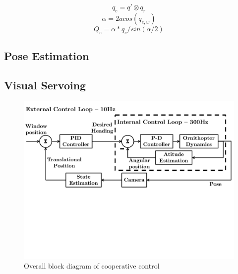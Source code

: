 \documentclass{aamas2013}
\begin{document}
\begin{equation}
\label{quat_error}
q_e = q'\otimes q_r
\end{equation}
\begin{equation}
\label{quat_angle}
\alpha = 2acos(q_{e,w})
\end{equation}
\begin{equation}
\label{quat_linearize}
Q_e = \alpha*q_e/sin(\alpha /2)
\end{equation}

\subsection{Pose Estimation}

\subsection{Visual Servoing}

\begin{figure}[tb]
\centering
\includegraphics[width=\linewidth]{figures/block_diagrams.pdf}
\caption{Overall block diagram of cooperative control}
\label{fig:block_diagram}
\end{figure}
\end{document}
